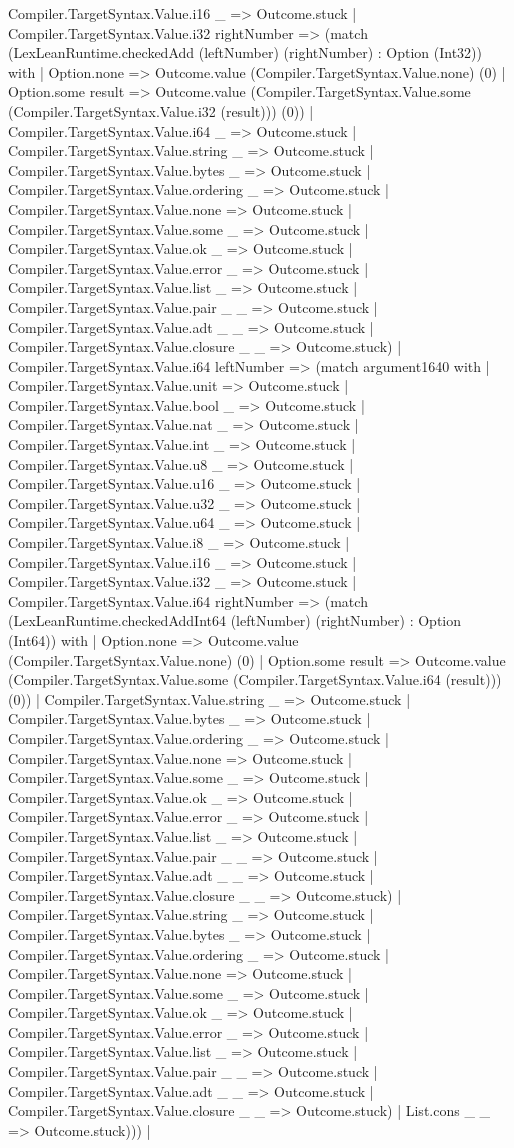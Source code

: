 \documentclass[11pt]{article}
\begin{document}
Compiler.TargetSyntax.Value.i16 \_ => Outcome.stuck | Compiler.TargetSyntax.Value.i32 rightNumber => (match (LexLeanRuntime.checkedAdd (leftNumber) (rightNumber) : Option (Int32)) with | Option.none => Outcome.value (Compiler.TargetSyntax.Value.none) (0) | Option.some result => Outcome.value (Compiler.TargetSyntax.Value.some (Compiler.TargetSyntax.Value.i32 (result))) (0)) | Compiler.TargetSyntax.Value.i64 \_ => Outcome.stuck | Compiler.TargetSyntax.Value.string \_ => Outcome.stuck | Compiler.TargetSyntax.Value.bytes \_ => Outcome.stuck | Compiler.TargetSyntax.Value.ordering \_ => Outcome.stuck | Compiler.TargetSyntax.Value.none => Outcome.stuck | Compiler.TargetSyntax.Value.some \_ => Outcome.stuck | Compiler.TargetSyntax.Value.ok \_ => Outcome.stuck | Compiler.TargetSyntax.Value.error \_ => Outcome.stuck | Compiler.TargetSyntax.Value.list \_ => Outcome.stuck | Compiler.TargetSyntax.Value.pair \_ \_ => Outcome.stuck | Compiler.TargetSyntax.Value.adt \_ \_ => Outcome.stuck | Compiler.TargetSyntax.Value.closure \_ \_ => Outcome.stuck) | Compiler.TargetSyntax.Value.i64 leftNumber => (match argument1640 with | Compiler.TargetSyntax.Value.unit => Outcome.stuck | Compiler.TargetSyntax.Value.bool \_ => Outcome.stuck | Compiler.TargetSyntax.Value.nat \_ => Outcome.stuck | Compiler.TargetSyntax.Value.int \_ => Outcome.stuck | Compiler.TargetSyntax.Value.u8 \_ => Outcome.stuck | Compiler.TargetSyntax.Value.u16 \_ => Outcome.stuck | Compiler.TargetSyntax.Value.u32 \_ => Outcome.stuck | Compiler.TargetSyntax.Value.u64 \_ => Outcome.stuck | Compiler.TargetSyntax.Value.i8 \_ => Outcome.stuck | Compiler.TargetSyntax.Value.i16 \_ => Outcome.stuck | Compiler.TargetSyntax.Value.i32 \_ => Outcome.stuck | Compiler.TargetSyntax.Value.i64 rightNumber => (match (LexLeanRuntime.checkedAddInt64 (leftNumber) (rightNumber) : Option (Int64)) with | Option.none => Outcome.value (Compiler.TargetSyntax.Value.none) (0) | Option.some result => Outcome.value (Compiler.TargetSyntax.Value.some (Compiler.TargetSyntax.Value.i64 (result))) (0)) | Compiler.TargetSyntax.Value.string \_ => Outcome.stuck | Compiler.TargetSyntax.Value.bytes \_ => Outcome.stuck | Compiler.TargetSyntax.Value.ordering \_ => Outcome.stuck | Compiler.TargetSyntax.Value.none => Outcome.stuck | Compiler.TargetSyntax.Value.some \_ => Outcome.stuck | Compiler.TargetSyntax.Value.ok \_ => Outcome.stuck | Compiler.TargetSyntax.Value.error \_ => Outcome.stuck | Compiler.TargetSyntax.Value.list \_ => Outcome.stuck | Compiler.TargetSyntax.Value.pair \_ \_ => Outcome.stuck | Compiler.TargetSyntax.Value.adt \_ \_ => Outcome.stuck | Compiler.TargetSyntax.Value.closure \_ \_ => Outcome.stuck) | Compiler.TargetSyntax.Value.string \_ => Outcome.stuck | Compiler.TargetSyntax.Value.bytes \_ => Outcome.stuck | Compiler.TargetSyntax.Value.ordering \_ => Outcome.stuck | Compiler.TargetSyntax.Value.none => Outcome.stuck | Compiler.TargetSyntax.Value.some \_ => Outcome.stuck | Compiler.TargetSyntax.Value.ok \_ => Outcome.stuck | Compiler.TargetSyntax.Value.error \_ => Outcome.stuck | Compiler.TargetSyntax.Value.list \_ => Outcome.stuck | Compiler.TargetSyntax.Value.pair \_ \_ => Outcome.stuck | Compiler.TargetSyntax.Value.adt \_ \_ => Outcome.stuck | Compiler.TargetSyntax.Value.closure \_ \_ => Outcome.stuck) | List.cons \_ \_ => Outcome.stuck))) | 
\end{document}
